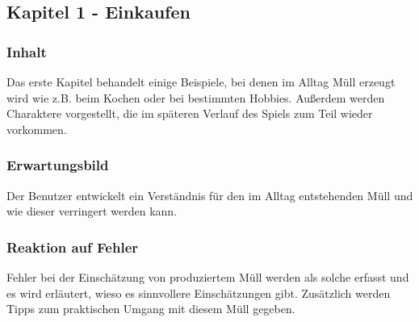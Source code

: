 \documentclass[a4paper]{article}
\begin{document}
    \subsection{Kapitel 1 - Einkaufen}
        \subsubsection{Inhalt}
            Das erste Kapitel behandelt einige Beispiele, bei denen im Alltag Müll erzeugt wird wie z.B. beim Kochen oder bei bestimmten Hobbies. Außerdem werden Charaktere vorgestellt, die im späteren Verlauf des Spiels zum Teil wieder vorkommen.
        \subsubsection{Erwartungsbild}
            Der Benutzer entwickelt ein Verständnis für den im Alltag entstehenden Müll und wie dieser verringert werden kann.
        \subsubsection{Reaktion auf Fehler}
            Fehler bei der Einschätzung von produziertem Müll werden als solche erfasst und es wird erläutert, wieso es sinnvollere Einschätzungen gibt. Zusätzlich werden Tipps zum praktischen Umgang mit diesem Müll gegeben.
\end{document}
